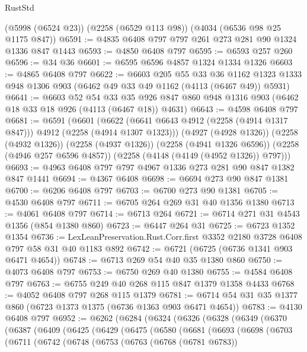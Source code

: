 \begin{lexlean}{RustStd}
\begin{coremodule}
    (@5998 (@6524 @23))
    (@2258 (@6529 @113 @98))
    (@4034 (@6536 @98 @25 @1175 @847))
@6591 := @4835 @6408 @797 @797 @261 @273 @281 @90 @1324 @1336 @847 @1443
@6593 := @4850 @6408 @797
@6595 := @6593 @257 @260
@6596 := @34 @36
@6601 := @6595 @6596 @4857 @1324 @1334 @1326
@6603 := @4865 @6408 @797
@6622 := @6603
    @205
    @55
    @33
    @36
    @1162
    @1323
    @1333
    @948
    @1306
    @903
    (@6462 @49 @33 @49 @1162 (@4113 (@6467 @49)) @5931)
@6641 := @6603
    @52
    @54
    @33
    @35
    @926
    @847
    @860
    @948
    @1316
    @903
    (@6462 @18 @33 @18 @926 (@4113 (@6467 @18)) @4631)
@6643 := @4598 @6408 @797
@6681 := @6591
    (@6601
      (@6622 (@6641 @6643 @4912 (@2258 (@4914 @1317 @847))) @4912 (@2258 (@4914 @1307 @1323)))
      (@4927 (@4928 @1326))
      (@2258 (@4932 @1326))
      (@2258 (@4937 @1326))
      (@2258 (@4941 @1326 @6596))
      (@2258 (@4946 @257 @6596 @4857))
      (@2258 (@4148 (@4149 (@4952 @1326)) @797)))
@6693 := @4963 @6408 @797 @797 @4967 @1336 @273 @281 @90 @847 @1382 @847 @1441
@6694 := @4367 @6408
@6698 := @6694 @273 @90 @847 @1381
@6700 := @6206 @6408 @797
@6703 := @6700 @273 @90 @1381
@6705 := @4530 @6408 @797
@6711 := @6705 @264 @269 @31 @40 @1356 @1380
@6713 := @4061 @6408 @797
@6714 := @6713 @264
@6721 := @6714 @271 @31 @4543 @1356 (@854 @1380 @860)
@6723 := @6447 @264 @31
@6725 := @6723 @1352 @1354
@6736 := LexLeanPreservation.Rust.Corr.first @3352 @2180 @3728 @6408 @797 @58 @31 @40 @1183 @892
@6742 := @6721 (@6725 (@6736 @1341 @903 @6471 @4654))
@6748 := @6713 @269 @54 @40 @35 @1380 @860
@6750 := @4073 @6408 @797
@6753 := @6750 @269 @40 @1380
@6755 := @4584 @6408 @797
@6763 := @6755 @249 @40 @268 @115 @847 @1379 @1358 @4433
@6768 := @4052 @6408 @797 @268 @115 @1379
@6781 := @6714 @54 @31 @35 @1377 @860 (@6723 @1373 @1375 (@6736 @1363 @903 @6471 @4654))
@6783 := @4130 @6408 @797
@6952 := @6262
    (@6284
      (@6324
        (@6326
          (@6328
            (@6349
              (@6370
                (@6387
                  (@6409
                    (@6425
                      (@6429
                        (@6475
                          (@6580
                            (@6681
                              (@6693
                                (@6698
                                  (@6703
                                    (@6711
                                      (@6742
                                        (@6748
                                          (@6753
                                            (@6763
                                              (@6768 (@6781 @6783))

\end{coremodule}
\end{lexlean}

